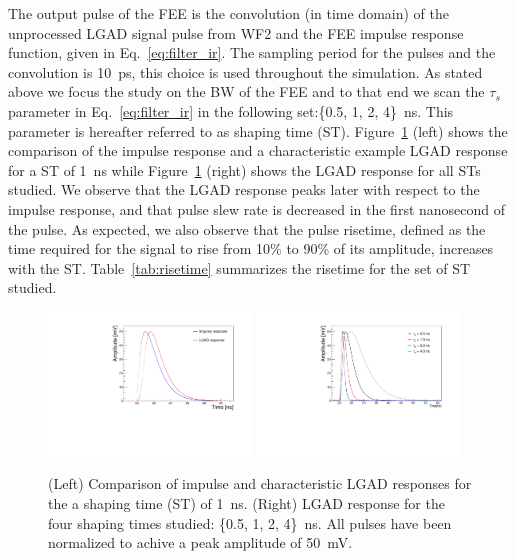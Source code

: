 \documentclass[preprint,1p]{elsarticle}
\begin{document}
The output pulse of the FEE is the convolution (in time domain) of the
unprocessed LGAD signal pulse from WF2 and the FEE impulse response function,
given in Eq.~\ref{eq:filter_ir}. The sampling period for the pulses and the
convolution is 10~\si{ps}, this choice is used throughout the
simulation. As stated above we focus the study on the BW of the FEE and to that
end we scan the $\tau_{s}$ parameter in Eq.~\ref{eq:filter_ir} in the following
set:\{0.5, 1, 2, 4\}~\si{ns}. This parameter is hereafter referred to as shaping
time (ST). Figure~\ref{fig:ir_and_lgad} (left) shows the comparison of the
impulse response and a characteristic example LGAD response for a ST of 1~\si{ns} while
Figure~\ref{fig:ir_and_lgad} (right) shows the LGAD response for all STs
studied. We observe that the LGAD response peaks later with respect to the
impulse response,  and that pulse slew rate is decreased in the first nanosecond
of the pulse. As expected, we also observe that the pulse risetime, defined as
the time required for the signal to rise from 10\% to 90\% of its
amplitude,  increases with the ST. Table~\ref{tab:risetime} summarizes the risetime
for the set of ST studied. 

\begin{figure}[htbp]
  \centering
  \includegraphics[width=0.48\textwidth]{figs/impulse_vs_lgad_response_1ns_shaping.pdf} \hfill
  \includegraphics[width=0.48\textwidth]{figs/lgad_all_shaping_time_noiseless.pdf}
  \caption{(Left) Comparison of impulse and characteristic LGAD responses for the a shaping time (ST) of 1~\si{ns}.
  (Right) LGAD response for the four shaping times studied: \{0.5, 1, 2, 4\}~\si{ns}. All pulses have been normalized
  to achive a peak amplitude of 50~\si{mV}. }
  \label{fig:ir_and_lgad}
\end{figure}
\end{document}

